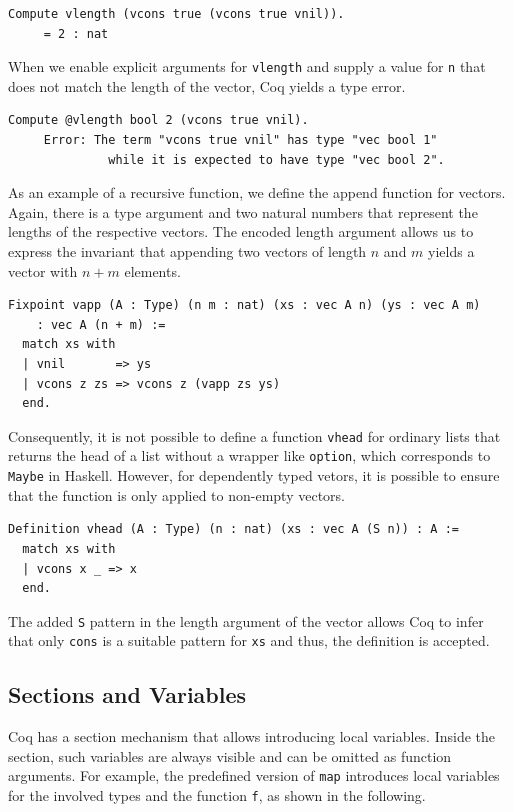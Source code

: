 \documentclass[a4paper, 11pt, fleqn, twoside]{scrreprt}
\newcommand{\hinl}[1]{\texttt{#1}}
\newcommand{\cinl}[1]{\texttt{#1}}
\begin{document}
\begin{verbatim}
Compute vlength (vcons true (vcons true vnil)).
     = 2 : nat
\end{verbatim}

When we enable explicit arguments for \cinl{vlength} and supply a value for \cinl{n} that does not match the length of the vector, Coq yields a type error.

\begin{verbatim}
Compute @vlength bool 2 (vcons true vnil).
     Error: The term "vcons true vnil" has type "vec bool 1"
              while it is expected to have type "vec bool 2".
\end{verbatim}

As an example of a recursive function, we define the append function for vectors.
Again, there is a type argument and two natural numbers that represent the lengths of the respective vectors.
The encoded length argument allows us to express the invariant that appending two vectors of length $n$ and $m$ yields a vector with $n + m$ elements.

\begin{verbatim}
Fixpoint vapp (A : Type) (n m : nat) (xs : vec A n) (ys : vec A m) 
    : vec A (n + m) :=
  match xs with
  | vnil       => ys
  | vcons z zs => vcons z (vapp zs ys)
  end.
\end{verbatim}


Consequently, it is not possible to define a function \cinl{vhead} for ordinary lists that returns the head of a list without a wrapper like \cinl{option}, which corresponds to \hinl{Maybe} in Haskell.
However, for dependently typed vetors, it is possible to ensure that the function is only applied to non-empty vectors.

\begin{verbatim}
Definition vhead (A : Type) (n : nat) (xs : vec A (S n)) : A :=
  match xs with
  | vcons x _ => x
  end.
\end{verbatim}

The added \cinl{S} pattern in the length argument of the vector allows Coq to infer that only \cinl{cons} is a suitable pattern for \cinl{xs} and thus, the definition is accepted.

\subsection{Sections and Variables}
Coq has a section mechanism that allows introducing local variables.
Inside the section, such variables are always visible and can be omitted as function arguments.
For example, the predefined version of \cinl{map} introduces local variables for the involved types and the function \cinl{f}, as shown in the following.
\end{document}
